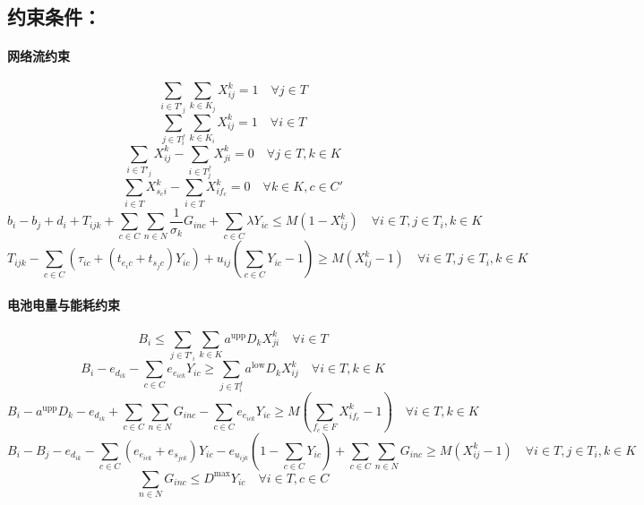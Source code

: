 \documentclass[11pt]{ctexart}
\begin{document}
\subsection*{约束条件：}
\paragraph{网络流约束}
\begin{equation}
\sum_{i \in T'_j} \sum_{k \in K_j} X^k_{ij} = 1 \quad \forall j \in T \tag{2}
\end{equation}
\begin{equation}
\sum_{j \in T^f_i} \sum_{k \in K_i} X^k_{ij} = 1 \quad \forall i \in T \tag{3}
\end{equation}
\begin{equation}
\sum_{i \in T'_j} X^k_{ij} - \sum_{i \in T^f_j} X^k_{ji} = 0 \quad \forall j \in T, k \in K \tag{4}
\end{equation}
\begin{equation}
\sum_{i \in T} X^k_{s_c i} - \sum_{i \in T} X^k_{i f_c} = 0 \quad \forall k \in K, c \in C' \tag{5}
\end{equation}
\begin{equation}
b_i - b_j + d_i + T_{ijk} + \sum_{c \in C} \sum_{n \in N} \frac{1}{\sigma_k} G_{inc} + \sum_{c \in C} \lambda Y_{ic} \le M(1 - X^k_{ij}) \quad \forall i \in T, j \in T_i, k \in K \tag{6}
\end{equation}
\begin{equation}
T_{ijk} - \sum_{c \in C} \left( \tau_{ic} + (t_{e_i c} + t_{s_j c}) Y_{ic} \right) + u_{ij} \left( \sum_{c \in C} Y_{ic} - 1 \right) \ge M(X^k_{ij} - 1) \quad \forall i \in T, j \in T_i, k \in K \tag{7}
\end{equation}
\paragraph{电池电量与能耗约束}
\begin{equation}
B_i \le \sum_{j \in T'_i} \sum_{k \in K} a^{\text{upp}} D_k X^k_{ji} \quad \forall i \in T \tag{8}
\end{equation}
\begin{equation}
B_i - e_{d_{ik}} - \sum_{c \in C} e_{e_{ic k}} Y_{ic} \ge \sum_{j \in T^f_i} a^{\text{low}} D_k X^k_{ij} \quad \forall i \in T, k \in K \tag{9}
\end{equation}
\begin{equation}
B_i - a^{\text{upp}} D_k - e_{d_{ik}} + \sum_{c \in C} \sum_{n \in N} G_{inc} - \sum_{c \in C} e_{e_{ic k}} Y_{ic} \ge M \left( \sum_{f_c \in F} X^k_{i f_c} - 1 \right) \quad \forall i \in T, k \in K \tag{10}
\end{equation}
\begin{equation}
B_i - B_j - e_{d_{ik}} - \sum_{c \in C} (e_{e_{ic k}} + e_{s_{j c k}}) Y_{ic} - e_{u_{ij k}} \left( 1 - \sum_{c \in C} Y_{ic} \right) + \sum_{c \in C} \sum_{n \in N} G_{inc} \ge M(X^k_{ij} - 1) \quad \forall i \in T, j \in T_i, k \in K \tag{11}
\end{equation}
\begin{equation}
\sum_{n \in N} G_{inc} \le D^{\max} Y_{ic} \quad \forall i \in T, c \in C \tag{12}
\end{equation}
\end{document}

